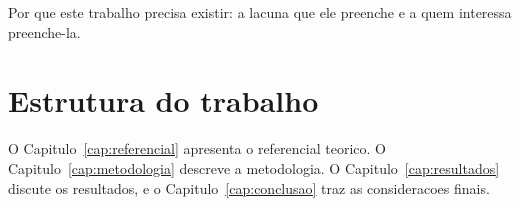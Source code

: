 Por que este trabalho precisa existir: a lacuna que ele preenche e a quem
interessa preenche-la.

\section{Estrutura do trabalho}
\label{sec:estrutura}

O Capitulo~\ref{cap:referencial} apresenta o referencial teorico. O
Capitulo~\ref{cap:metodologia} descreve a metodologia. O
Capitulo~\ref{cap:resultados} discute os resultados, e o
Capitulo~\ref{cap:conclusao} traz as consideracoes finais.
